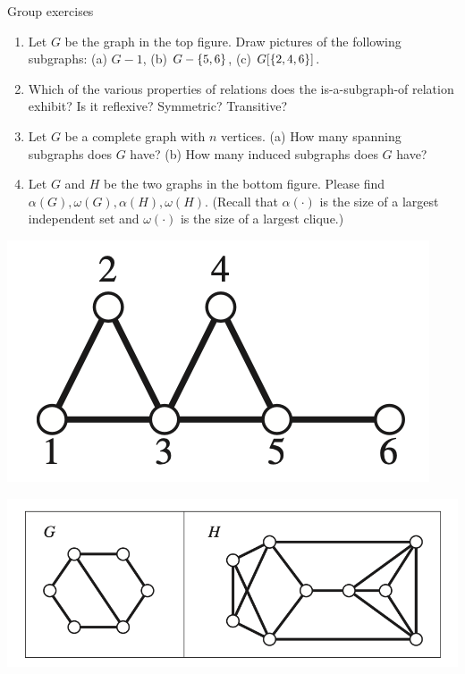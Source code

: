 \documentclass[10pt]{beamer}
\begin{document}
\begin{frame}{Group exercises}
\small 
\noindent
\begin{minipage}[c]{0.6\textwidth}
\begin{enumerate}
	\item  Let $G$ be the graph in the top figure.   Draw pictures of the following subgraphs: (a) $G-1$, (b) $G-\{ {5,6} \}$, (c) $G[\{ {2,4,6} \}]$.
	\item Which of the various properties of relations does the is-a-subgraph-of relation exhibit? Is it reflexive? Symmetric? Transitive?
    \item Let $G$ be a complete graph with $n$ vertices.  (a) How many spanning subgraphs does $G$ have? (b) How many induced subgraphs does $G$ have?
    \item Let $G$ and $H$ be the two graphs in the bottom figure.  Please find $\alpha(G), \omega(G), \alpha(H), \omega(H)$.  (Recall that $\alpha(\cdot)$ is the size of a largest independent set and $\omega(\cdot)$ is the size of a largest clique.) 
\end{enumerate}
\end{minipage}%
\hfill
\begin{minipage}[c]{0.38\textwidth}
   
    \includegraphics[width=\textwidth]{images/subgraph_1} %
    
    \vspace{2cm}
    
    \includegraphics[width=\textwidth]{images/subgraph_2}
     \vspace{2cm}
\end{minipage}%

\end{frame}
\end{document}
